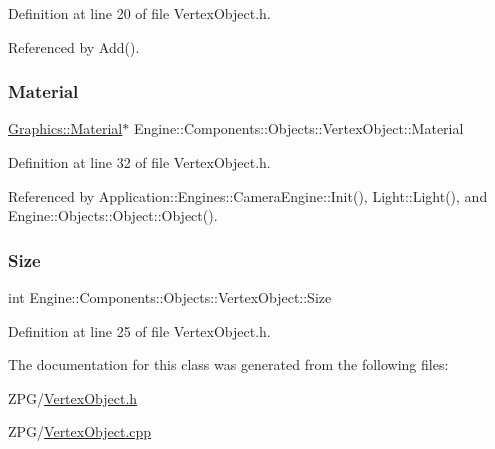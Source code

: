 Definition at line 20 of file Vertex\+Object.\+h.



Referenced by Add().

\mbox{\label{classEngine_1_1Components_1_1Objects_1_1VertexObject_a86c1fced4cdc5e59a66a635390a17eca}} 
\subsubsection{\texorpdfstring{Material}{Material}}
{\footnotesize\ttfamily \mbox{\hyperlink{classEngine_1_1Components_1_1Graphics_1_1Material}{Graphics\+::\+Material}}$\ast$ Engine\+::\+Components\+::\+Objects\+::\+Vertex\+Object\+::\+Material}



Definition at line 32 of file Vertex\+Object.\+h.



Referenced by Application\+::\+Engines\+::\+Camera\+Engine\+::\+Init(), Light\+::\+Light(), and Engine\+::\+Objects\+::\+Object\+::\+Object().

\mbox{\label{classEngine_1_1Components_1_1Objects_1_1VertexObject_a13ec6e4a92520bdd1b33ad6de757cb92}} 
\subsubsection{\texorpdfstring{Size}{Size}}
{\footnotesize\ttfamily int Engine\+::\+Components\+::\+Objects\+::\+Vertex\+Object\+::\+Size\hspace{0.3cm}{\ttfamily [protected]}}



Definition at line 25 of file Vertex\+Object.\+h.



The documentation for this class was generated from the following files\+:\begin{DoxyCompactItemize}
\item 
Z\+P\+G/\mbox{\hyperlink{VertexObject_8h}{Vertex\+Object.\+h}}\item 
Z\+P\+G/\mbox{\hyperlink{VertexObject_8cpp}{Vertex\+Object.\+cpp}}\end{DoxyCompactItemize}
